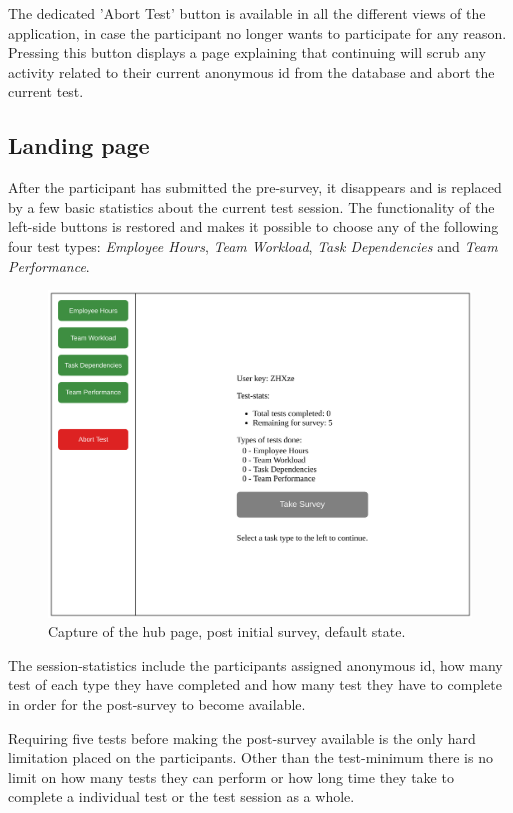 {  The dedicated 'Abort Test' button is available in all the different
  views of the application, in case the participant no longer wants to
  participate for any reason. Pressing this button displays a page
  explaining that continuing will scrub any activity related to their
  current anonymous id from the database and abort the current test.


  \subsection{Landing page}

  After the participant has submitted the pre-survey, it  disappears and is
  replaced by a few basic statistics about the current test session.
  The functionality of the left-side buttons is restored and makes it
  possible to choose any of the following four test types:
  \textit{Employee Hours},
  \textit{Team Workload},
  \textit{Task Dependencies} and
  \textit{Team Performance}.

  \begin{figure}[h!]
    \centering
    \includegraphics[width=.7\textwidth]{figures/captures/webapp_main_statistics.pdf}
    \caption{Capture of the hub page, post initial survey, default state.}
    \label{label_mainStatistics}
  \end{figure}

  The session-statistics include the participants assigned anonymous id,
  how many test of each type they have completed and how many test they
  have to complete in order for the post-survey to become available.

  Requiring five tests before making the post-survey available is the only
  hard limitation placed on the participants. Other than the test-minimum
  there is no limit on how many tests they can perform or how long time
  they take to complete a individual test or the test session as a whole.

}
